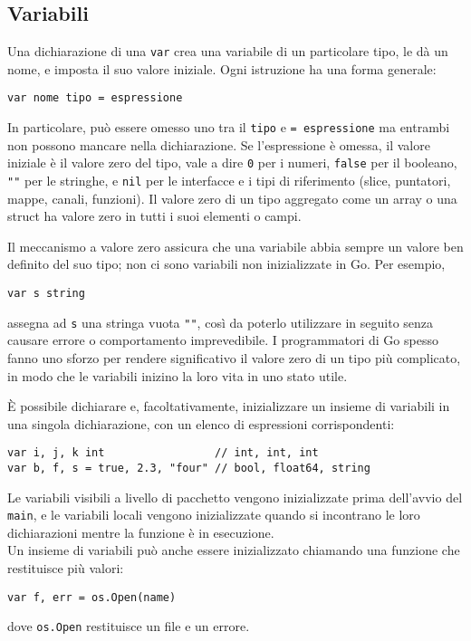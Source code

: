 \documentclass[../../thesis.tex]{subfiles}
\begin{document}
    \subsection{Variabili}\label{subsec:variabili}
    Una dichiarazione di una \verb"var" crea una variabile di un particolare tipo, le dà un nome, e imposta il suo valore iniziale.
    Ogni istruzione ha una forma generale:
    \begin{lstlisting}[label = {lst:lstlisting1-3.1}]
var nome tipo = espressione
    \end{lstlisting}
    In particolare, può essere omesso uno tra il \verb"tipo" e \verb"= espressione" ma entrambi non possono mancare nella dichiarazione.
    Se l'espressione è omessa, il valore iniziale è il valore zero del tipo, vale a dire \verb"0" per i numeri, \verb"false" per il booleano, \verb|""| per le stringhe, e \verb"nil" per le interfacce e i tipi di riferimento (slice, puntatori, mappe, canali, funzioni).
    Il valore zero di un tipo aggregato come un array o una struct ha valore zero in tutti i suoi elementi o campi.
    \hfill \vspace{12pt}

    Il meccanismo a valore zero assicura che una variabile abbia sempre un valore ben definito del suo tipo;
    non ci sono variabili non inizializzate in Go. Per esempio,
    \begin{lstlisting}[frame = single, label = {lst:lstlisting1-3.2}]
var s string
    \end{lstlisting}
    assegna ad \verb"s" una stringa vuota \verb|""|, così da poterlo utilizzare in seguito senza causare errore o comportamento imprevedibile.
    I programmatori di Go spesso fanno uno sforzo per rendere significativo il valore zero di un tipo più complicato, in modo che le variabili inizino la loro vita in uno stato utile.
    \hfill \vspace{12pt}

    È possibile dichiarare e, facoltativamente, inizializzare un insieme di variabili in una singola dichiarazione, con un elenco di espressioni corrispondenti:
    \begin{lstlisting}[frame = single, label = {lst:lstlisting1-3.3}]
var i, j, k int                 // int, int, int
var b, f, s = true, 2.3, "four"	// bool, float64, string
    \end{lstlisting}
    Le variabili visibili a livello di pacchetto vengono inizializzate prima dell'avvio del \verb"main", e le variabili locali vengono inizializzate quando si incontrano le loro dichiarazioni mentre la funzione è in esecuzione.\\
    Un insieme di variabili può anche essere inizializzato chiamando una funzione che restituisce più valori:
    \begin{lstlisting}[frame = single, label = {lst:lstlisting1-3.4}]
var f, err = os.Open(name)
    \end{lstlisting}
    dove \verb"os.Open" restituisce un file e un errore.
    
    
    
    
\end{document}
